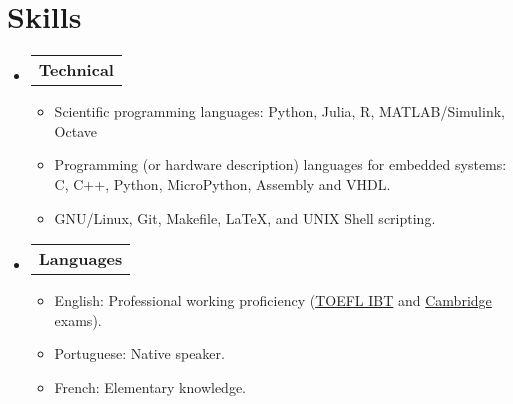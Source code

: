 \section{Skills}

\begin{itemize}[leftmargin=0.15in, label={}] %
  \item   \begin{tabular*}{0.2\textwidth}{l} \textbf{Technical} \end{tabular*}\vspace{-7pt} %
          \begin{itemize} %
            \item Scientific programming languages: Python, Julia, R, MATLAB/Simulink, Octave
            \item Programming (or hardware description) languages for embedded systems: C, C++, Python, MicroPython, Assembly and VHDL. %
            \item GNU/Linux, Git, Makefile, \LaTeX, and UNIX Shell scripting.
          \end{itemize}\vspace{-5pt}
  \item   \begin{tabular*}{0.2\textwidth}{l} \textbf{Languages} \end{tabular*}\vspace{-6pt} %
          \begin{itemize}
            \item English: Professional working proficiency (\href{https://github.com/tapyu/tapyu/blob/master/cv/Latex/figs/Toefl.pdf}{TOEFL IBT} and \href{https://github.com/tapyu/tapyu/blob/master/cv/Latex/figs/Cambridge\%20FCE.pdf}{Cambridge} exams).
            \item Portuguese: Native speaker.
            \item French: Elementary knowledge.
          \end{itemize}
\end{itemize} %
